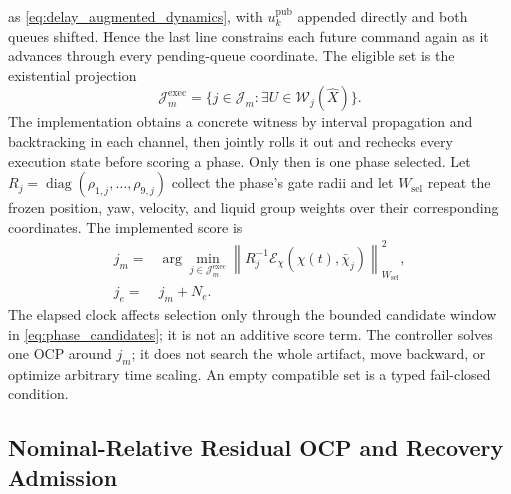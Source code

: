 as \eqref{eq:delay_augmented_dynamics}, with $u_k^{\mathrm{pub}}$ appended
directly and both queues shifted.  Hence the last line constrains each future
command again as it advances through every pending-queue coordinate.  The
eligible set is the existential projection
\begin{equation}
  \mathcal J_m^{\mathrm{exec}}=
  \{j\in\mathcal J_m:\exists U\in\mathcal W_j(\widehat X)\}.
  \label{eq:phase_execution_filter}
\end{equation}
The implementation obtains a concrete witness by interval propagation and
backtracking in each channel, then jointly rolls it out and rechecks every
execution state before scoring a phase.
Only then is one phase selected.  Let
$R_j=\operatorname{diag}(\rho_{1,j},\ldots,\rho_{9,j})$ collect the phase's
gate radii and let $W_{\mathrm{sel}}$ repeat the frozen position, yaw,
velocity, and liquid group weights over their corresponding coordinates.  The
implemented score is
\begin{equation}
\begin{aligned}
  j_m={}&\arg\min_{j\in\mathcal J_m^{\mathrm{exec}}}
  \left\|R_j^{-1}
  \mathcal E_\chi(\widehat\chi(t),\bar\chi_j)
  \right\|_{W_{\mathrm{sel}}}^2,\\
  j_e={}&j_m+N_e.
\end{aligned}
  \label{eq:phase_selection}
\end{equation}
The elapsed clock affects selection only through the bounded candidate window
in \eqref{eq:phase_candidates}; it is not an additive score term.
The controller solves one OCP around $j_m$; it does not search the whole
artifact, move backward, or optimize arbitrary time scaling.  An empty
compatible set is a typed fail-closed condition.

\subsection{Nominal-Relative Residual OCP and Recovery Admission}

